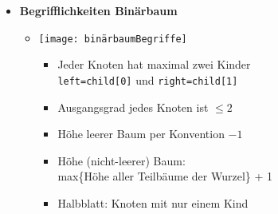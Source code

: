 \begin{itemize}
            \item \textbf{Begrifflichkeiten Binärbaum}
                \begin{itemize}
                    \item[]
                        \begin{minipage}[t]{0.45\textwidth}
                            \texttt{[image: binärbaumBegriffe]}
                        \end{minipage}
                        \begin{minipage}[t]{0.45\textwidth}
                            \vspace{-4.5cm}
                            \begin{itemize}
                                \item Jeder Knoten hat maximal zwei Kinder \\
                                        \texttt{left=child[0]} und \texttt{right=child[1]}
                                \item Ausgangsgrad jedes Knoten ist $\leq 2$
                                \item Höhe leerer Baum per Konvention $-1$
                                \item Höhe (nicht-leerer) Baum: \\
                                        max\{Höhe aller Teilbäume der Wurzel\} + 1
                                \item Halbblatt: Knoten mit nur einem Kind
                            \end{itemize}
                        \end{minipage}
                \end{itemize}

\pagebreak


\end{itemize}

